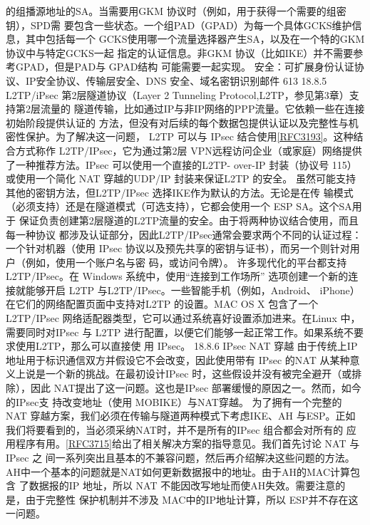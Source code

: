 的组播源地址的SA。当需要用GKM 协议时（例如，用于获得一个需要的组密钥），SPD需
要包含一些状态。一个组PAD（GPAD）为每一个具体GCKS维护信息，其中包括每一个
GCKS使用哪一个流量选择器产生SA，以及在一个特的GKM 协议中与特定GCKS一起
指定的认证信息。非GKM 协议（比如IKE）并不需要参考GPAD，但是PAD与 GPAD结构
可能需要一起实现。
安全：可扩展身份认证协议、IP安全协议、传输层安全、DNS 安全、域名密钥识别邮件 613
18.8.5
L2TP/iPsec
第2层隧道协议（Layer 2 Tunneling Protocol,L2TP，参见第3章）支持第2层流量的
隧道传输，比如通过IP与非IP网络的PPP流量。它依赖一些在连接初始阶段提供认证的
方法，但没有对后续的每个数据包提供认证以及完整性与机密性保护。为了解决这一问题，
L2TP 可以与 IPsec 结合使用\href{https://www.rfc-editor.org/rfc/rfc3193}{[RFC3193]}。这种结合方式称作 L2TP/IPsec，它为通过第2层
VPN远程访问企业（或家庭）网络提供了一种推荐方法。IPsec 可以使用一个直接的L2TP-
over-IP 封装（协议号 115）或使用一个简化 NAT 穿越的UDP/IP 封装来保证L2TP 的安全。
虽然可能支持其他的密钥方法，但L2TP/IPsec 选择IKE作为默认的方法。无论是在传
输模式（必须支持）还是在隧道模式（可选支持），它都会使用一个 ESP SA。这个SA用于
保证负责创建第2层隧道的L2TP流量的安全。由于将两种协议结合使用，而且每一种协议
都涉及认证部分，因此L2TP/IPsec通常会要求两个不同的认证过程：一个针对机器（使用
IPsec 协议以及预先共享的密钥与证书），而另一个则针对用户（例如，使用一个账户名与密
码，或访问令牌）。
许多现代化的平台都支持L2TP/IPsec。在 Windows 系统中，使用“连接到工作场所”
选项创建一个新的连接就能够开启 L2TP 与L2TP/IPsec。一些智能手机（例如，Android、
iPhone）在它们的网络配置页面中支持对L2TP 的设置。MAC OS X 包含了一个 L2TP/IPsec
网络适配器类型，它可以通过系统喜好设置添加进来。在Linux 中，需要同时对IPsec 与
L2TP 进行配置，以便它们能够一起正常工作。如果系统不要求使用L2TP，那么可以直接使
用 IPsec。
18.8.6 IPsec NAT 穿越
由于传统上IP地址用于标识通信双方并假设它不会改变，因此使用带有 IPsec 的NAT
从某种意义上说是一个新的挑战。在最初设计IPsec 时，这些假设并没有被完全避开（或排
除），因此 NAT提出了这一问题。这也是IPsec 部署缓慢的原因之一。然而，如今的IPsec支
持改变地址（使用 MOBIKE）与NAT穿越。
为了拥有一个完整的 NAT 穿越方案，我们必须在传输与隧道两种模式下考虑IKE、AH
与ESP。正如我们将要看到的，当必须采纳NAT时，并不是所有的IPsec 组合都会对所有的
应用程序有用。\href{https://www.rfc-editor.org/rfc/rfc3715}{[RFC3715]}给出了相关解决方案的指导意见。我们首先讨论 NAT 与 IPsec 之
间一系列突出且基本的不兼容问题，然后再介绍解决这些问题的方法。
AH中一个基本的问题就是NAT如何更新数据报中的地址。由于AH的MAC计算包含
了数据报的IP 地址，所以 NAT 不能因改写地址而使AH失效。需要注意的是，由于完整性
保护机制并不涉及 MAC中的IP地址计算，所以 ESP并不存在这一问题。
